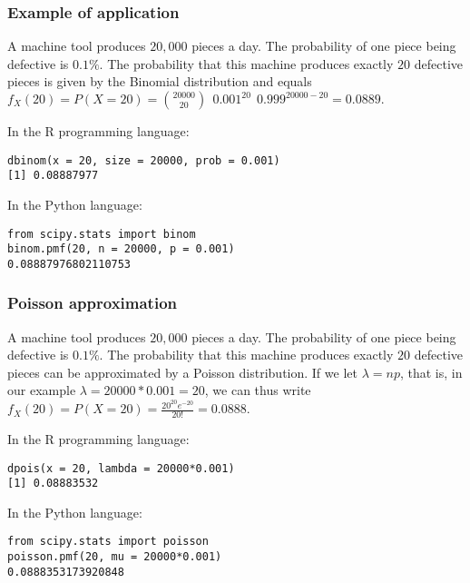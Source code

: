 \documentclass[border=5mm, convert, usenames, dvipsnames,beamer]{standalone}
\begin{document}
\begin{frame}[ fragile]{}
\frametitle{Example of application}

\vspace{30}
\noindent
A machine tool produces $20,000$ pieces a day. The probability of one piece being defective is $0.1\%$. The probability that this machine produces exactly $20$ defective pieces is given by the Binomial distribution and equals $f_{X}(20)= P(X=20) = \binom{20000}{20} \ \ 0.001^{20} \ \ 0.999^{20 000-20} = 0.0889.$


\normalsize

\vspace{10}
\noindent
In the R programming language:
\begin{lstlisting}[style=
R]
dbinom(x = 20, size = 20000, prob = 0.001)
[1] 0.08887977
\end{lstlisting}

\vspace{5}
\noindent
In the Python language:
\begin{lstlisting}[style=Python]
from scipy.stats import binom
binom.pmf(20, n = 20000, p = 0.001)
0.08887976802110753
\end{lstlisting}

\par

\end{frame}

\begin{frame}[ fragile]{}

\frametitle{Poisson approximation}


\vspace{40}
\noindent
A machine tool produces $20,000$ pieces a day. The probability of one piece being defective is $0.1 \%$. The probability that this machine produces exactly $20$ defective pieces can be approximated by a Poisson distribution. If we let $\lambda = np$, that is, in our example $\lambda = 20000*0.001 = 20$, we can thus write $f_{X}(20)= P(X=20) = \frac{20^{20} e^{-20}}{20!} = 0.0888.$


\vspace{10}
\noindent
In the R programming language:
\begin{lstlisting}[style=R]
dpois(x = 20, lambda = 20000*0.001)
[1] 0.08883532
\end{lstlisting}

\vspace{5}
\noindent
In the Python language:
\begin{lstlisting}[style=Python]
from scipy.stats import poisson
poisson.pmf(20, mu = 20000*0.001)
0.0888353173920848
\end{lstlisting}

\end{frame}
\end{document}
